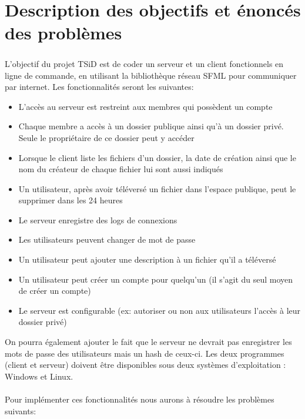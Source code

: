 \documentclass[12pt,a4paper,twoside]{article}
\begin{document}
	\section{Description des objectifs et énoncés des problèmes} %
		\subparagraph*{}
			L'objectif du projet TSiD est de coder un serveur et un client fonctionnels en ligne de commande, en utilisant la bibliothèque réseau SFML pour communiquer par internet.
			Les fonctionnalités seront les suivantes:
			\begin{itemize}
				\item{} L'accès au serveur est restreint aux membres qui possèdent un compte
				\item{} Chaque membre a accès à un dossier publique ainsi qu'à un dossier privé. Seule le propriétaire de ce dossier peut y accéder
				\item{} Lorsque le client liste les fichiers d'un dossier, la date de création ainsi que le nom du créateur de chaque fichier lui sont aussi indiqués
				\item{} Un utilisateur, après avoir téléversé un fichier dans l'espace publique, peut le supprimer dans les 24 heures
				\item{} Le serveur enregistre des logs de connexions
				\item{} Les utilisateurs peuvent changer de mot de passe
				\item{} Un utilisateur peut ajouter une description à un fichier qu'il a téléversé
				\item{} Un utilisateur peut créer un compte pour quelqu'un (il s'agit du seul moyen de créer un compte)
				\item{} Le serveur est configurable (ex: autoriser ou non aux utilisateurs l'accès à leur dossier privé)
			\end{itemize}
			On pourra également ajouter le fait que le serveur ne devrait pas enregistrer les mots de passe des utilisateurs mais un hash de ceux-ci.
			Les deux programmes (client et serveur) doivent être disponibles sous deux systèmes d'exploitation : Windows et Linux.\\\\
			Pour implémenter ces fonctionnalités nous aurons à résoudre les problèmes suivants:
\end{document}
